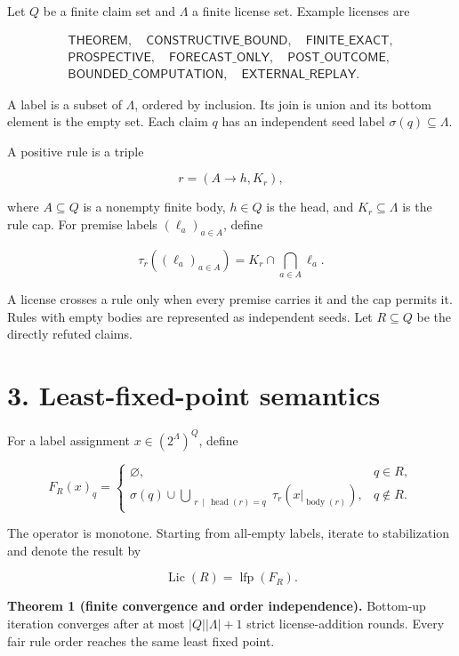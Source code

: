 \documentclass[
  11pt,
]{article}
\begin{document}
Let \(Q\) be a finite claim set and \(\Lambda\) a finite license set.
Example licenses are

\[
\begin{gathered}
\textsf{THEOREM}, \quad \textsf{CONSTRUCTIVE\_BOUND}, \quad
\textsf{FINITE\_EXACT}, \\
\textsf{PROSPECTIVE}, \quad \textsf{FORECAST\_ONLY}, \quad
\textsf{POST\_OUTCOME}, \\
\textsf{BOUNDED\_COMPUTATION}, \quad \textsf{EXTERNAL\_REPLAY}.
\end{gathered}
\]

A label is a subset of \(\Lambda\), ordered by inclusion. Its join is
union and its bottom element is the empty set. Each claim \(q\) has an
independent seed label \(\sigma(q)\subseteq\Lambda\).

A positive rule is a triple

\[
r=(A\to h, K_r),
\]

where \(A\subseteq Q\) is a nonempty finite body, \(h\in Q\) is the
head, and \(K_r\subseteq\Lambda\) is the rule cap. For premise labels
\((\ell_a)_{a\in A}\), define

\[
\tau_r((\ell_a)_{a\in A})
=K_r\cap\bigcap_{a\in A}\ell_a.
\]

A license crosses a rule only when every premise carries it and the cap
permits it. Rules with empty bodies are represented as independent
seeds. Let \(R\subseteq Q\) be the directly refuted claims.

\hypertarget{least-fixed-point-semantics}{%
\section{3. Least-fixed-point
semantics}\label{least-fixed-point-semantics}}

For a label assignment \(x\in(2^\Lambda)^Q\), define

\[
F_R(x)_q=
\begin{cases}
\varnothing,&q\in R, \\
\displaystyle\sigma(q)\cup
\bigcup_{\substack{r\,\mid\,\operatorname{head}(r)=q}}
\tau_r(x|_{\operatorname{body}(r)}),&q\notin R.
\end{cases}
\]

The operator is monotone. Starting from all-empty labels, iterate to
stabilization and denote the result by

\[
\operatorname{Lic}(R)=\operatorname{lfp}(F_R).
\]

\textbf{Theorem 1 (finite convergence and order independence).}
Bottom-up iteration converges after at most \(|Q||\Lambda|+1\) strict
license-addition rounds. Every fair rule order reaches the same least
fixed point.
\end{document}
